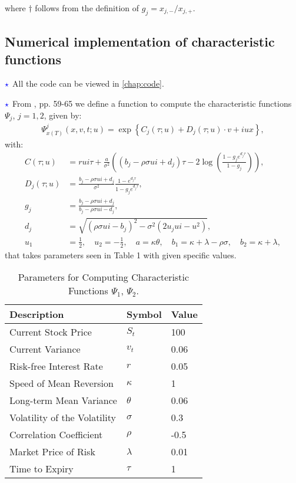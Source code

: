 \documentclass[12pt]{article}
\numberwithin{equation}{section}
\newcommand{\lc}{\left\{}
\newcommand{\rc}{\right\}}
\begin{document}
where $\dagger$ follows from the definition of $g_j=x_{j,-}/x_{j,+}$.
\newpage
\subsection{Numerical implementation of characteristic functions
}
$\textcolor{blue}{\star}$ All the code can be viewed in \autoref{chap:code}. 

$\textcolor{blue}{\star}$ From \cite{Havrylenko2024}, pp. 59-65 we define a
function to compute the characteristic functions $\Psi_j$, $j=1,2$, given by:
\begin{align*}
    \Psi_{x(T)}^j(x,v,t;u)=\exp \lc C_j (\tau; u) + D_j (\tau; u) \cdot v + i  u x \rc,
\end{align*}
with:
\begin{align*}
    C(\tau ; u) &= rui\tau + \frac{a}{\sigma^2}\left( (b_j - \rho\sigma ui + d_j) \tau - 2 \log \left( \frac{1 - g_j e^{d_j \tau}}{1 - g_j} \right) \right), \\
    D_j(\tau ; u) &= \frac{b_j - \rho \sigma ui + d_j}{\sigma^2} \frac{1 - e^{d_j \tau}}{1 - g_j e^{d_j \tau}}, \\
    g_j &= \frac{b_j - \rho\sigma ui + d_j}{b_j - \rho\sigma ui - d_j}, \\
    d_j &= \sqrt{(\rho\sigma ui - b_j)^2 - \sigma^2(2u_jui - u^2)},\\
    u_1 &= \frac{1}{2}, \quad u_2 = -\frac{1}{2}, \quad a = \kappa\theta, \quad b_1 = \kappa + \lambda - \rho\sigma, \quad b_2 = \kappa + \lambda,
\end{align*}
that takes parameters seen in Table 1 with given specific values.
\begin{table}[!h]
    \centering
    \begin{tabular}{lll}
    \toprule
    \textbf{Description} & \textbf{Symbol} & \textbf{Value} \\
    \midrule
    Current Stock Price & $S_t$ & 100 \\
    Current Variance & $v_t$ & 0.06 \\
    Risk-free Interest Rate & $r$ & 0.05 \\
    Speed of Mean Reversion & $\kappa$ & 1 \\
    Long-term Mean Variance & $\theta$ & 0.06 \\
    Volatility of the Volatility & $\sigma$ & 0.3 \\
    Correlation Coefficient & $\rho$ & -0.5 \\
    Market Price of Risk & $\lambda$ & 0.01 \\
    Time to Expiry & $\tau$ & 1 \\
    \bottomrule
    \end{tabular}
    \caption{Parameters for Computing Characteristic Functions $\Psi_1$, $\Psi_2$.}
    \label{table:characteristic_functions}
\end{table}
\end{document}
